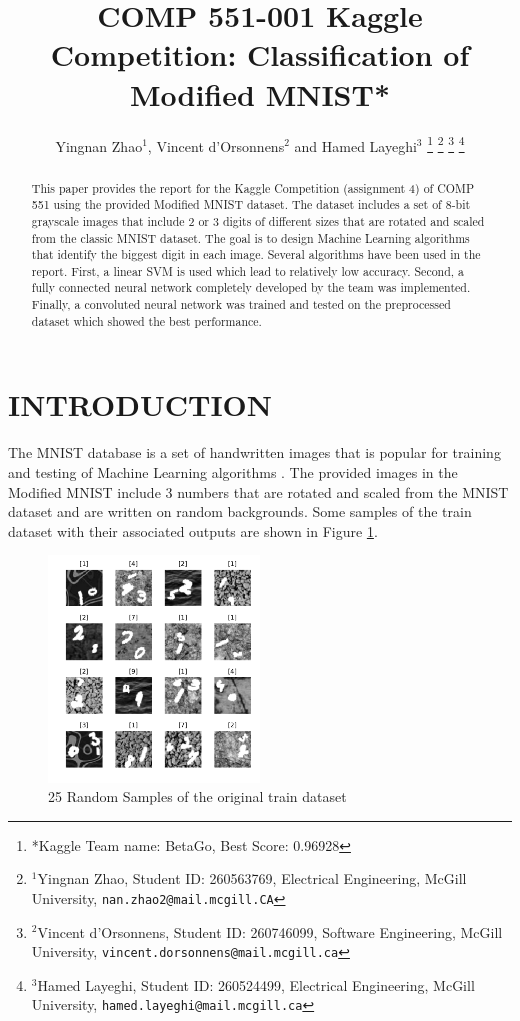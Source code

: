 \documentclass[letterpaper, 10 pt, conference]{ieeeconf}  %
\title{\LARGE \bf
COMP 551-001 Kaggle Competition: Classification of Modified MNIST*
}
\author{Yingnan Zhao$^{1}$, Vincent d'Orsonnens$^{2}$ and Hamed Layeghi$^{3}$%
\thanks{*Kaggle Team name: BetaGo, Best Score: 0.96928}%
\thanks{$^{1}$Yingnan Zhao, Student ID: 260563769, Electrical Engineering, 
        McGill University,
        {\tt\small nan.zhao2@mail.mcgill.CA}}%
\thanks{$^{2}$Vincent d'Orsonnens, Student ID: 260746099, Software Engineering, McGill University, 
        {\tt\small vincent.dorsonnens@mail.mcgill.ca}}%
\thanks{$^{3}$Hamed Layeghi, Student ID: 260524499, Electrical Engineering, McGill University, 
	{\tt\small hamed.layeghi@mail.mcgill.ca}}%
}
\begin{document}
\maketitle
\thispagestyle{empty}
\pagestyle{empty}


\begin{abstract}
This paper provides the report for the Kaggle Competition (assignment 4) of COMP 551 using the provided Modified MNIST dataset. The dataset includes a set of 8-bit grayscale images that include 2 or 3 digits of different sizes that are rotated and scaled from the classic MNIST dataset. The goal is to design Machine Learning algorithms that identify the biggest digit in each image. Several algorithms have been used in the report. First, a linear SVM is used which lead to relatively low accuracy. Second, a fully connected neural network completely developed by the team was implemented. Finally, a convoluted neural network was trained and tested on the preprocessed dataset which showed the best performance.  
\end{abstract}


\section{INTRODUCTION}

The MNIST database \cite{MNISTcreators} is a set of handwritten images that is popular for training and testing of Machine Learning algorithms \cite{wiki:MNIST}.
The provided images in the Modified MNIST include 3 numbers that are rotated and scaled from the MNIST dataset and are written on random backgrounds.
Some samples of the train dataset with their associated outputs are shown in Figure \ref{fig:original}.
\begin{figure}[h]
	\begin{center}
		\includegraphics[width=0.5\textwidth]{figures/originalDataset.pdf}  %
		\caption{25 Random Samples of the original train dataset}
		\label{fig:original}
	\end{center}
\end{figure}
\end{document}
